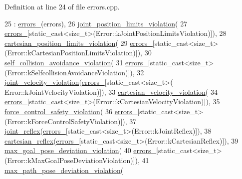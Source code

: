 Definition at line 24 of file errors.\+cpp.


\begin{DoxyCode}
25     : \hyperlink{structfranka_1_1Errors_ab269bb0ad30eb1aaa7009a246be8e8aa}{errors\_}(errors),
26       \hyperlink{structfranka_1_1Errors_a44ba0d45e52639280d32cf447f967e29}{joint\_position\_limits\_violation}(
27           \hyperlink{structfranka_1_1Errors_ab269bb0ad30eb1aaa7009a246be8e8aa}{errors\_}[static\_cast<size\_t>(Error::kJointPositionLimitsViolation)]),
28       \hyperlink{structfranka_1_1Errors_a41c8b50ecbb015a2dba1a3dbbff694b6}{cartesian\_position\_limits\_violation}(
29           \hyperlink{structfranka_1_1Errors_ab269bb0ad30eb1aaa7009a246be8e8aa}{errors\_}[static\_cast<size\_t>(Error::kCartesianPositionLimitsViolation)]),
30       \hyperlink{structfranka_1_1Errors_adf68f6333624cb5558864441a991de8c}{self\_collision\_avoidance\_violation}(
31           \hyperlink{structfranka_1_1Errors_ab269bb0ad30eb1aaa7009a246be8e8aa}{errors\_}[static\_cast<size\_t>(Error::kSelfcollisionAvoidanceViolation)]),
32       \hyperlink{structfranka_1_1Errors_a803ac4acbc26350602ea2eb02b7b30c4}{joint\_velocity\_violation}(\hyperlink{structfranka_1_1Errors_ab269bb0ad30eb1aaa7009a246be8e8aa}{errors\_}[static\_cast<size\_t>(
      Error::kJointVelocityViolation)]),
33       \hyperlink{structfranka_1_1Errors_a382fbec6b463ddcc2cbfd90340021ff1}{cartesian\_velocity\_violation}(
34           \hyperlink{structfranka_1_1Errors_ab269bb0ad30eb1aaa7009a246be8e8aa}{errors\_}[static\_cast<size\_t>(Error::kCartesianVelocityViolation)]),
35       \hyperlink{structfranka_1_1Errors_ae7b19674da28b11ba970c30c7d800923}{force\_control\_safety\_violation}(
36           \hyperlink{structfranka_1_1Errors_ab269bb0ad30eb1aaa7009a246be8e8aa}{errors\_}[static\_cast<size\_t>(Error::kForceControlSafetyViolation)]),
37       \hyperlink{structfranka_1_1Errors_afb0928680c586e73d4e2cd4b42c7fe48}{joint\_reflex}(\hyperlink{structfranka_1_1Errors_ab269bb0ad30eb1aaa7009a246be8e8aa}{errors\_}[static\_cast<size\_t>(Error::kJointReflex)]),
38       \hyperlink{structfranka_1_1Errors_a47bd58b0ab2198e4d038e0a24eafb310}{cartesian\_reflex}(\hyperlink{structfranka_1_1Errors_ab269bb0ad30eb1aaa7009a246be8e8aa}{errors\_}[static\_cast<size\_t>(Error::kCartesianReflex)]),
39       \hyperlink{structfranka_1_1Errors_ac55d3624087e606cb4ffab121869d580}{max\_goal\_pose\_deviation\_violation}(
40           \hyperlink{structfranka_1_1Errors_ab269bb0ad30eb1aaa7009a246be8e8aa}{errors\_}[static\_cast<size\_t>(Error::kMaxGoalPoseDeviationViolation)]),
41       \hyperlink{structfranka_1_1Errors_ad90cffe703ca1b782007f3ba49da587c}{max\_path\_pose\_deviation\_violation}(

\end{DoxyCode}
